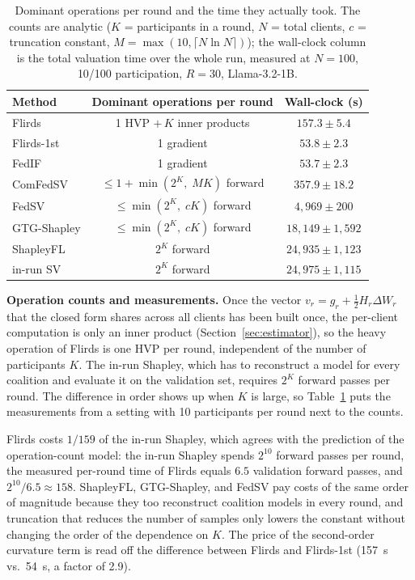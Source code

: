 \documentclass[letterpaper]{article} %
\theoremstyle{definition} %
\begin{document}
\begin{table}[t]
\centering
\small
\setlength{\tabcolsep}{4pt}
\caption{Dominant operations per round and the time they actually took. The
counts are analytic ($K$ = participants in a round, $N$ = total clients,
$c$ = truncation constant, $M = \max(10, \lceil N \ln N\rceil)$); the
wall-clock column is the total valuation time over the whole run, measured
at $N{=}100$, 10/100 participation, $R{=}30$, Llama-3.2-1B.}
\label{tab:cost}
\begin{tabular}{lcc}
\hline
Method & Dominant operations per round & Wall-clock (s) \\
\hline
Flirds & 1 HVP $+\,K$ inner products & $157.3\pm5.4$ \\
Flirds-1st & 1 gradient & $53.8\pm2.3$ \\
FedIF & 1 gradient & $53.7\pm2.3$ \\
ComFedSV & $\le 1 + \min(2^K,\; MK)$ forward & $357.9\pm18.2$ \\
FedSV & $\le \min(2^K,\; cK)$ forward & $4{,}969\pm200$ \\
GTG-Shapley & $\le \min(2^K,\; cK)$ forward & $18{,}149\pm1{,}592$ \\
ShapleyFL & $2^K$ forward & $24{,}935\pm1{,}123$ \\
in-run SV & $2^K$ forward & $24{,}975\pm1{,}115$ \\
\hline
\end{tabular}
\end{table}

\textbf{Operation counts and measurements.} Once the vector
$v_r = g_r + \tfrac12 H_r \Delta W_r$ that the closed form shares across all
clients has been built once, the per-client computation is only an inner
product (Section~\ref{sec:estimator}), so the heavy operation of Flirds is
one HVP per round, independent of the number of participants $K$. The in-run
Shapley, which has to reconstruct a model for every coalition and evaluate it
on the validation set, requires $2^K$ forward passes per round. The
difference in order shows up when $K$ is large, so Table~\ref{tab:cost} puts
the measurements from a setting with 10 participants per round next to the
counts.

Flirds costs $1/159$ of the in-run Shapley, which agrees with the prediction
of the operation-count model: the in-run Shapley spends $2^{10}$ forward
passes per round, the measured per-round time of Flirds equals $6.5$
validation forward passes, and $2^{10}/6.5 \approx 158$. ShapleyFL,
GTG-Shapley, and FedSV pay costs of the same order of magnitude because they
too reconstruct coalition models in every round, and truncation that reduces
the number of samples only lowers the constant without changing the order of
the dependence on $K$. The price of the second-order curvature term is read
off the difference between Flirds and Flirds-1st (157~s vs.\ 54~s, a factor
of 2.9).
\end{document}
